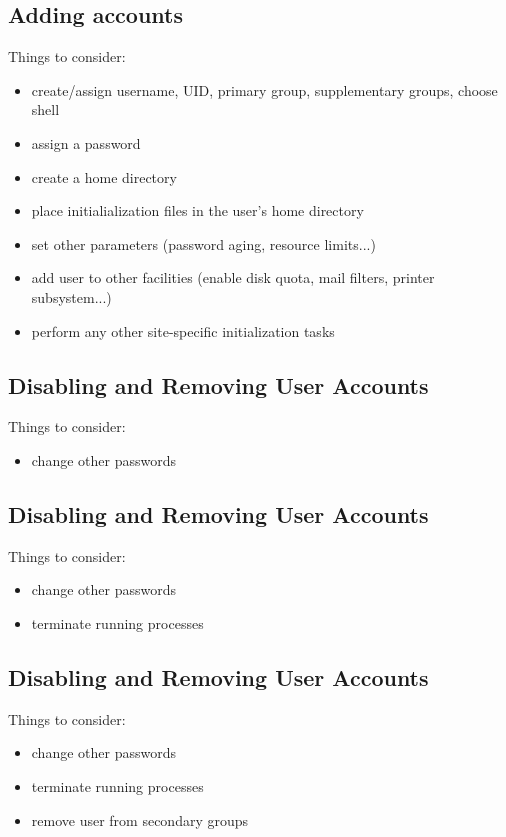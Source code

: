 \documentclass[xga]{xdvislides}
\begin{document}
\subsection{Adding accounts}
Things to consider:
\begin{itemize}
	\item create/assign username, UID, primary group, supplementary groups,
		choose shell
	\item assign a password
	\item create a home directory
	\item place initialialization files in the user's home directory
	\item set other parameters (password aging, resource limits...)
	\item add user to other facilities (enable disk quota, mail filters,
		printer subsystem...)
	\item perform any other site-specific initialization tasks
\end{itemize}

\subsection{Disabling and Removing User Accounts}
Things to consider:
\begin{itemize}
	\item change other passwords
\end{itemize}

\subsection{Disabling and Removing User Accounts}
Things to consider:
\begin{itemize}
	\item change other passwords
	\item terminate running processes
\end{itemize}

\subsection{Disabling and Removing User Accounts}
Things to consider:
\begin{itemize}
	\item change other passwords
	\item terminate running processes
	\item remove user from secondary groups
\end{itemize}
\end{document}
